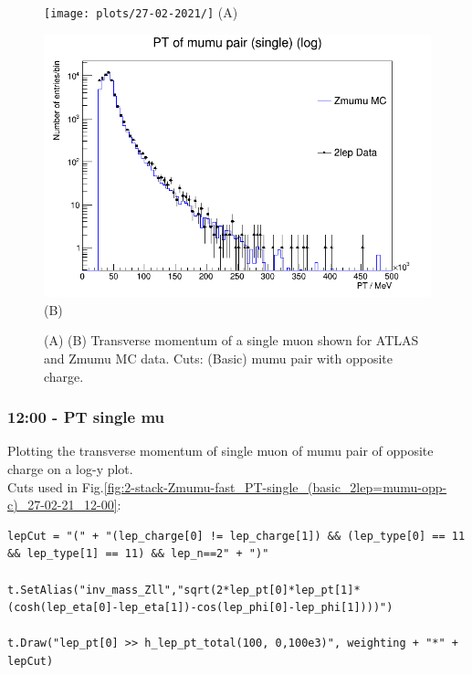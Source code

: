 
\begin{figure}[h!]
    \centering
    \begin{minipage}{0.5\textwidth}
        \centering
        \texttt{[image: plots/27-02-2021/]}
        (A)
    \end{minipage}\hfill
    \begin{minipage}{0.5\textwidth}
        \centering
        \includegraphics[width=\linewidth]{plots/27-02-2021/2-Statck-Zmumu-fast_PT-single_log-y_(basic-cuts_2lep=mumu_opp-c)_27-02-21_11-50.png}
        (B)
    \end{minipage}
    \caption{(A)  (B) Transverse momentum of a single muon shown for ATLAS and Zmumu MC data.  Cuts: (Basic) mumu pair with opposite charge.}
    \label{}
\end{figure}


\subsubsection*{12:00 - PT single mu}
Plotting the transverse momentum of single muon of mumu pair of opposite charge on a log-y plot.
\\
Cuts used in Fig.\ref{fig:2-stack-Zmumu-fast_PT-single_(basic_2lep=mumu-opp-c)_27-02-21_12-00}:
\begin{lstlisting}
lepCut = "(" + "(lep_charge[0] != lep_charge[1]) && (lep_type[0] == 11 && lep_type[1] == 11) && lep_n==2" + ")"

t.SetAlias("inv_mass_Zll","sqrt(2*lep_pt[0]*lep_pt[1]*(cosh(lep_eta[0]-lep_eta[1])-cos(lep_phi[0]-lep_phi[1])))")

t.Draw("lep_pt[0] >> h_lep_pt_total(100, 0,100e3)", weighting + "*" + lepCut)
\end{lstlisting}

